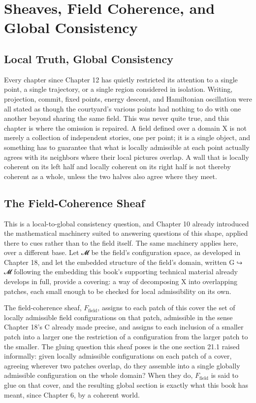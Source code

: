 \chapter{Sheaves, Field Coherence, and Global Consistency}

\section{Local Truth, Global Consistency}

Every chapter since Chapter 12 has quietly restricted its attention to a single point, a single trajectory, or a single region considered in isolation. Writing, projection, commit, fixed points, energy descent, and Hamiltonian oscillation were all stated as though the courtyard's various points had nothing to do with one another beyond sharing the same field. This was never quite true, and this chapter is where the omission is repaired. A field defined over a domain X is not merely a collection of independent stories, one per point; it is a single object, and something has to guarantee that what is locally admissible at each point actually agrees with its neighbors where their local pictures overlap. A wall that is locally coherent on its left half and locally coherent on its right half is not thereby coherent as a whole, unless the two halves also agree where they meet.

\section{The Field-Coherence Sheaf}

This is a local-to-global consistency question, and Chapter 10 already introduced the mathematical machinery suited to answering questions of this shape, applied there to cues rather than to the field itself. The same machinery applies here, over a different base. Let 𝓜 be the field's configuration space, as developed in Chapter 18, and let the embedded structure of the field's domain, written G ↪ 𝓜 following the embedding this book's supporting technical material already develops in full, provide a covering: a way of decomposing X into overlapping patches, each small enough to be checked for local admissibility on its own.

The field-coherence sheaf, \(F_{\mathrm{field}}\), assigns to each patch of this cover the set of locally admissible field configurations on that patch, admissible in the sense Chapter 18's C already made precise, and assigns to each inclusion of a smaller patch into a larger one the restriction of a configuration from the larger patch to the smaller. The gluing question this sheaf poses is the one section 21.1 raised informally: given locally admissible configurations on each patch of a cover, agreeing wherever two patches overlap, do they assemble into a single globally admissible configuration on the whole domain? When they do, \(F_{\mathrm{field}}\) is said to glue on that cover, and the resulting global section is exactly what this book has meant, since Chapter 6, by a coherent world.

